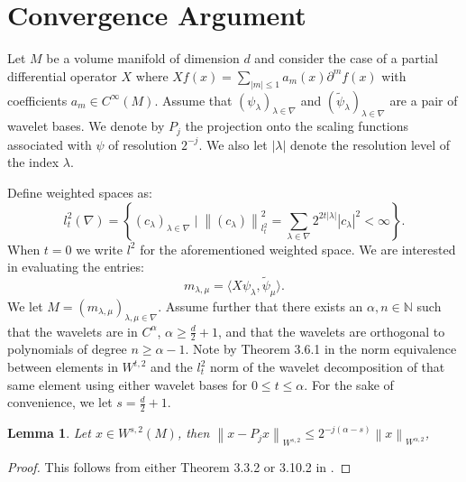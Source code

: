 \documentclass[12pt]{amsart}
\title{}
\author{}
\date{} %
\newtheorem{lemma}{Lemma}
\newcommand{\N}{\mathbb{N}}
\newcommand{\card}[1]{{\lvert#1\rvert}}
\newcommand{\abs}[1]{\ensuremath{\left\lvert #1\right\rvert}}
\newcommand{\norm}[1]{\ensuremath{\left\lVert #1\right\rVert}}
\begin{document}
\section{Convergence Argument}

Let $M$ be a volume manifold of dimension $d$ and consider the case of a partial differential operator $X$ where $X f(x) = \sum_{\abs{m}\leq 1} a_m(x) \partial^m f(x)$ with coefficients $a_m \in C^{\infty}(M)$. Assume that $(\psi_\lambda)_{\lambda \in \nabla}$ and $(\tilde{\psi}_\lambda)_{\lambda \in \nabla}$ are a pair of wavelet bases. We denote by $P_j$ the projection onto the scaling functions associated with $\psi$ of resolution $2^{-j}$. We also let $\card{\lambda}$ denote the resolution level of the index $\lambda$. 

Define weighted spaces as:
\begin{equation}
	l_t^2(\nabla) = \left\{ (c_\lambda)_{\lambda\in\nabla} \mid \norm{(c_\lambda)}_{l^2_t}^2 = \sum_{\lambda \in \nabla} 2^{2t\card{\lambda}}\abs{c_\lambda}^2 < \infty  \right\}.
\end{equation}
When $t = 0$ we write $l^2$ for the aforementioned weighted space. We are interested in evaluating the entries:
\begin{equation}
	m_{\lambda,\mu} = \langle X \psi_\lambda, \tilde{\psi}_\mu \rangle.
\end{equation}
We let $M=(m_{\lambda,\mu})_{\lambda,\mu \in \nabla}$. Assume further that there exists an $\alpha,n \in \N$ such that the wavelets are in $C^{\alpha}$, $\alpha \geq \frac{d}{2} + 1$, and that the wavelets are orthogonal to polynomials of degree $n \geq \alpha - 1$.  Note by Theorem 3.6.1 in \cite{} the norm equivalence between elements in $W^{t,2}$ and the $l_t^2$ norm of the wavelet decomposition of that same element using either wavelet bases for $0\leq t \leq \alpha$. For the sake of convenience, we let $s = \frac{d}{2} + 1$. 

\begin{lemma}
	Let $x \in W^{s,2}(M)$, then $\norm{x - P_j x}_{W^{s,2}} \leq  2^{-j(\alpha - s)}\norm{x}_{W^{\alpha,2}}$,
\end{lemma}
\begin{proof}
	This follows from either Theorem 3.3.2 or 3.10.2 in \cite{}.
\end{proof}
\end{document}

